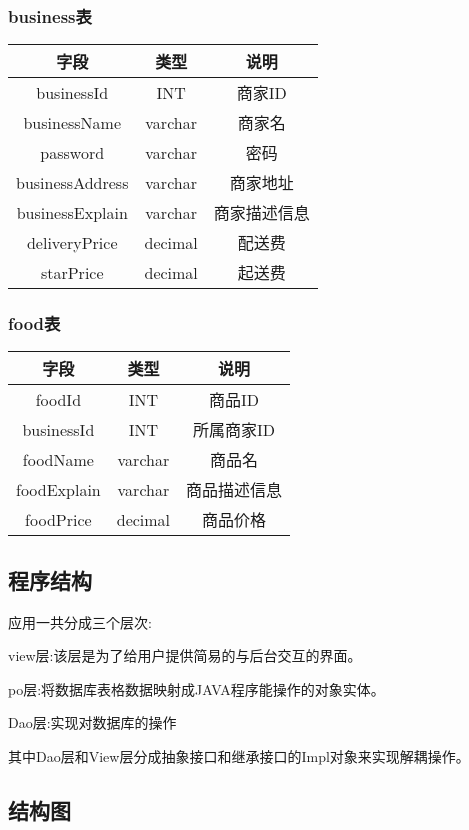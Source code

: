     
    
    \subsubsection{business表}
    \begin{tabular}{c|c|c}
    	\hline
    	字段 & 类型 & 说明 \\
    	\hline
    	businessId & INT & 商家ID \\
    	\hline
    	businessName & varchar & 商家名 \\
    	\hline
    	password & varchar & 密码 \\
    	\hline
    	businessAddress & varchar & 商家地址 \\
    	\hline
    	businessExplain & varchar & 商家描述信息 \\
    	\hline
    	deliveryPrice & decimal & 配送费 \\
    	\hline
    	starPrice & decimal & 起送费 \\
    \end{tabular}
    
    
    
    \subsubsection{food表}
    \begin{tabular}{c|c|c}
    	\hline
    	字段 & 类型 & 说明 \\
    	\hline
    	foodId & INT & 商品ID \\
    	\hline
    	businessId & INT & 所属商家ID \\
    	\hline
    	foodName & varchar & 商品名 \\
    	\hline
    	foodExplain & varchar & 商品描述信息 \\
    	\hline
    	foodPrice & decimal & 商品价格 \\
    \end{tabular}
\subsection{程序结构}
应用一共分成三个层次:

view层:该层是为了给用户提供简易的与后台交互的界面。

po层:将数据库表格数据映射成JAVA程序能操作的对象实体。

Dao层:实现对数据库的操作

其中Dao层和View层分成抽象接口和继承接口的Impl对象来实现解耦操作。
\subsection{结构图}

